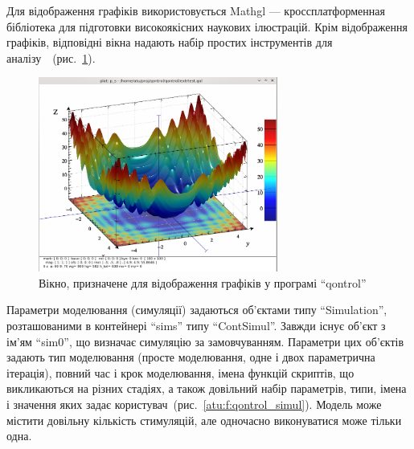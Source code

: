 Для відображення графіків використовується Mathgl ---
кроссплатформенная бібліотека для підготовки високоякісних
наукових ілюстрацій. Крім відображення графіків,
відповідні вікна надають набір простих інструментів для
аналізу~\cite{atu_jacs2015}~(рис.~\ref{atu:f:qontrol_3d}).


\begin{figure}[htb!]
  \begin{center}
    \includegraphics[width=0.7\textwidth]{p/qontrol_3d_a.png}
  \end{center}
\caption{Вікно, призначене для відображення графіків у програмі ``qontrol''}
  \label{atu:f:qontrol_3d}
\end{figure}

Параметри моделювання (симуляції) задаються об'єктами
типу ``Simulation'', розташованими в контейнері ``sims'' типу ``ContSimul''.
Завжди існує об'єкт з ім'ям ``sim0'', що визначає симуляцію за
замовчуванням. Параметри цих об'єктів задають тип моделювання
(просте моделювання, одне і двох параметрична ітерація), повний
час і крок моделювання, імена функцій скриптів, що викликаються на
різних стадіях, а також довільний набір параметрів, типи, імена
і значення яких задає користувач~(рис.~\ref{atu:f:qontrol_simul}). Модель
може містити довільну кількість стимуляцій, але одночасно
виконуватися може тільки одна.

